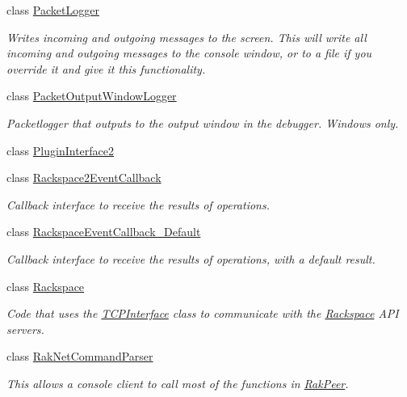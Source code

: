 \begin{DoxyCompactItemize}
class \hyperlink{class_rak_net_1_1_packet_logger}{Packet\-Logger}
\begin{DoxyCompactList}\small\item\em Writes incoming and outgoing messages to the screen. This will write all incoming and outgoing messages to the console window, or to a file if you override it and give it this functionality. \end{DoxyCompactList}\item 
class \hyperlink{class_rak_net_1_1_packet_output_window_logger}{Packet\-Output\-Window\-Logger}
\begin{DoxyCompactList}\small\item\em Packetlogger that outputs to the output window in the debugger. Windows only. \end{DoxyCompactList}\item 
class \hyperlink{class_rak_net_1_1_plugin_interface2}{Plugin\-Interface2}
\item 
class \hyperlink{class_rak_net_1_1_rackspace2_event_callback}{Rackspace2\-Event\-Callback}
\begin{DoxyCompactList}\small\item\em Callback interface to receive the results of operations. \end{DoxyCompactList}\item 
class \hyperlink{class_rak_net_1_1_rackspace_event_callback___default}{Rackspace\-Event\-Callback\-\_\-\-Default}
\begin{DoxyCompactList}\small\item\em Callback interface to receive the results of operations, with a default result. \end{DoxyCompactList}\item 
class \hyperlink{class_rak_net_1_1_rackspace}{Rackspace}
\begin{DoxyCompactList}\small\item\em Code that uses the \hyperlink{class_rak_net_1_1_t_c_p_interface}{T\-C\-P\-Interface} class to communicate with the \hyperlink{class_rak_net_1_1_rackspace}{Rackspace} A\-P\-I servers. \end{DoxyCompactList}\item 
class \hyperlink{class_rak_net_1_1_rak_net_command_parser}{Rak\-Net\-Command\-Parser}
\begin{DoxyCompactList}\small\item\em This allows a console client to call most of the functions in \hyperlink{class_rak_net_1_1_rak_peer}{Rak\-Peer}. \end{DoxyCompactList}\item 

\end{DoxyCompactItemize}
